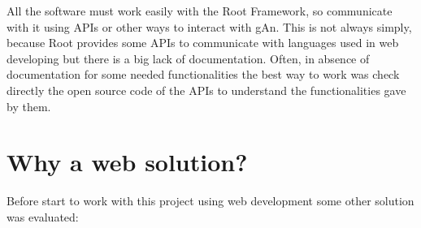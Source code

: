 \begin{enumerate}
All the software must work easily with the Root Framework, so communicate with it using APIs or other ways to interact with gAn. This is not always simply, because Root provides some APIs to communicate with languages used in web developing but there is a big lack of documentation. Often, in absence of documentation for some needed functionalities the best way to work was check directly the open source code of the APIs to understand the functionalities gave by them.

\end{enumerate}

\section{Why a web solution?}

Before start to work with this project using web development some other solution was evaluated:


